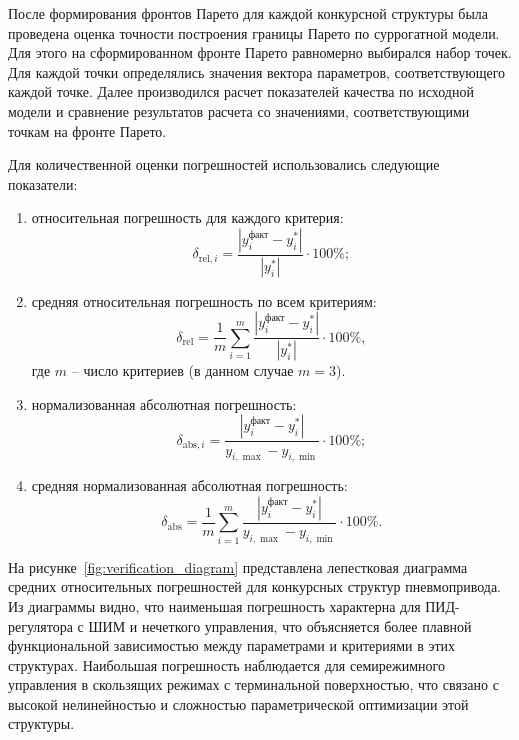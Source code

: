 После формирования фронтов Парето для каждой конкурсной структуры
была проведена оценка точности построения границы Парето по суррогатной
модели. Для этого на сформированном фронте Парето равномерно выбирался
набор точек. Для каждой точки определялись значения вектора параметров,
соответствующего каждой точке. Далее производился расчет показателей качества
по исходной модели и сравнение результатов расчета со значениями,
соответствующими точкам на фронте Парето.

Для количественной оценки погрешностей использовались следующие показатели:
\begin{enumerate}[label=\arabic*)]
	\item относительная погрешность для каждого критерия:
	      \begin{equation}\label{eq:relative_error}
		      \delta_{\text{rel},i} = \frac{|y_i^{\text{факт}} - y_i^*|}{|y_i^*|} \cdot 100\%;
	      \end{equation}

	\item средняя относительная погрешность по всем критериям:
	      \begin{equation}\label{eq:mean_relative_error}
		      \delta_{\text{rel}} = \frac{1}{m} \sum_{i=1}^{m} \frac{|y_i^{\text{факт}} - y_i^*|}{|y_i^*|} \cdot 100\%,
	      \end{equation}
      где $m$ -- число критериев (в данном случае $m = 3$).

	\item нормализованная абсолютная погрешность:
	      \begin{equation}\label{eq:normalized_absolute_error}
		      \delta_{\text{abs},i} = \frac{|y_i^{\text{факт}} - y_i^*|}{y_{i,\max} - y_{i,\min}} \cdot 100\%;
	      \end{equation}

	\item средняя нормализованная абсолютная погрешность:
	      \begin{equation}\label{eq:mean_normalized_absolute_error}
		      \delta_{\text{abs}} = \frac{1}{m} \sum_{i=1}^{m} \frac{|y_i^{\text{факт}} - y_i^*|}{y_{i,\max} - y_{i,\min}} \cdot 100\%.
	      \end{equation}
\end{enumerate}

На рисунке~\ref{fig:verification_diagram} представлена лепестковая диаграмма
средних относительных погрешностей для конкурсных структур пневмопривода.
Из диаграммы видно, что наименьшая погрешность характерна для ПИД-регулятора с
ШИМ и нечеткого управления, что объясняется более плавной функциональной зависимостью
между параметрами и критериями в этих структурах. Наибольшая погрешность наблюдается
для семирежимного управления в скользящих режимах с терминальной поверхностью, что
связано с высокой нелинейностью и сложностью параметрической оптимизации этой структуры.

